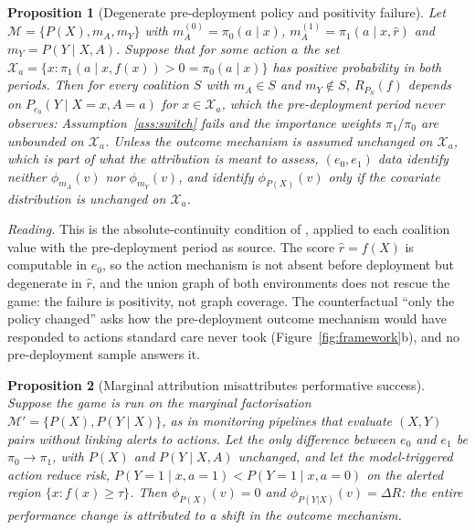 \documentclass[letterpaper]{article} %
\newtheorem{proposition}{Proposition}
\newcommand{\rhat}{\hat r}
\begin{document}
\begin{proposition}[Degenerate pre-deployment policy and positivity failure]
\label{prop:absence}
Let $\mathcal{M} = \{P(X), m_A, m_Y\}$ with $m_A^{(0)} = \pi_0(a \mid x)$,
$m_A^{(1)} = \pi_1(a \mid x, \rhat)$ and $m_Y = P(Y \mid X, A)$. Suppose that
for some action $a$ the set
$\mathcal{X}_a = \{x : \pi_1(a \mid x, f(x)) > 0 = \pi_0(a \mid x)\}$ has
positive probability in both periods. Then for every coalition $S$ with
$m_A \in S$ and $m_Y \notin S$, $R_{P_S}(f)$ depends on
$P_{e_0}(Y \mid X = x, A = a)$ for $x \in \mathcal{X}_a$, which the
pre-deployment period never observes: Assumption~\ref{ass:switch} fails and
the importance weights $\pi_1 / \pi_0$ are unbounded on $\mathcal{X}_a$.
Unless the outcome mechanism is assumed unchanged on $\mathcal{X}_a$, which
is part of what the attribution is meant to assess, $(e_0, e_1)$ data
identify neither $\phi_{m_A}(v)$ nor $\phi_{m_Y}(v)$, and identify
$\phi_{P(X)}(v)$ only if the covariate distribution is unchanged on
$\mathcal{X}_a$.
\end{proposition}

\noindent\emph{Reading.} This is the absolute-continuity condition of
\citet{boeken2024evaluating}, applied to each coalition value with the
pre-deployment period as source. The score $\rhat = f(X)$ is computable in
$e_0$, so the action mechanism is not absent before deployment but degenerate
in $\rhat$, and the union graph of both environments does not rescue the game:
the failure is positivity, not graph coverage. The counterfactual ``only the
policy changed'' asks how the pre-deployment outcome mechanism would have
responded to actions standard care never took
(Figure~\ref{fig:framework}b), and no pre-deployment sample answers it.

\begin{proposition}[Marginal attribution misattributes performative success]
\label{prop:misattr}
Suppose the game is run on the marginal factorisation
$\mathcal{M}' = \{P(X), P(Y \mid X)\}$, as in monitoring pipelines that
evaluate $(X, Y)$ pairs without linking alerts to actions. Let the only
difference between $e_0$ and $e_1$ be
$\pi_0 \to \pi_1$, with $P(X)$ and $P(Y \mid X, A)$ unchanged, and let the
model-triggered action reduce risk, $P(Y{=}1 \mid x, a{=}1) < P(Y{=}1 \mid x,
a{=}0)$ on the alerted region $\{x : f(x) \geq \tau\}$. Then
$\phi_{P(X)}(v) = 0$ and $\phi_{P(Y|X)}(v) = \Delta R$: the entire performance
change is attributed to a shift in the outcome mechanism.
\end{proposition}
\end{document}
